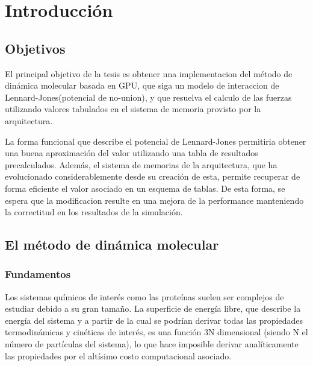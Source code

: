 \documentclass[a4paper,10pt]{report}
\begin{document}
\pagebreak




\tableofcontents

\pagebreak


\chapter{Introducción}


\section{Objetivos}



El principal objetivo de la tesis es obtener una implementacion del método de dinámica molecular basada en GPU, que siga un modelo de interaccion de 
Lennard-Jones(potencial de no-union), y que resuelva el calculo de las fuerzas utilizando valores tabulados en el sistema de memoria provisto por la arquitectura. 

La forma funcional que describe el potencial de Lennard-Jones permitiria obtener una buena aproximación del valor utilizando una tabla de resultados precalculados. 
Además, el sistema de memorias de la arquitectura, que ha evolucionado considerablemente desde su creación de esta, permite recuperar de forma eficiente el valor asociado en un esquema de tablas. 
De esta forma, se espera que la modificacion resulte en una mejora de la performance manteniendo la correctitud en los resultados de la simulación. 



\section{El método de dinámica molecular}

\subsection{Fundamentos}


Los sistemas químicos de interés como las proteínas suelen ser complejos de estudiar debido a su gran tamaño. 
La superficie de energía libre, que describe la energía del sistema y a partir de la cual se podrían derivar todas las propiedades termodinámicas y cinéticas de interés, es una función 3N dimensional (siendo N el número de partículas del sistema), lo que hace imposible derivar analíticamente las propiedades por el altísimo costo computacional asociado.
\end{document}
